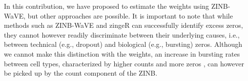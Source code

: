 \documentclass{bmcart}
\newcommand{\RPack}[1]{\textsf{#1}}
\newcommand{\fanny}[1]{\textcolor{blue}{*** FP: #1}}
\newcommand{\koen}[1]{\textcolor{olive}{*** KVdB: #1}}
\begin{document}

In this contribution, we have proposed to estimate the weights using ZINB-WaVE, but other approaches are possible. It is important to note that while methods such as ZINB-WaVE and \RPack{zingeR} can successfully identify excess zeros, they cannot however readily discriminate between their underlying causes, i.e., between technical (e.g., dropout) and biological (e.g., bursting) zeros. Although we cannot make this distinction with the weights, an increase in bursting rates between cell types, characterized by higher counts and more zeros \citep{Fujita2016}, can however be picked up by the count component of the ZINB.

\end{document}
